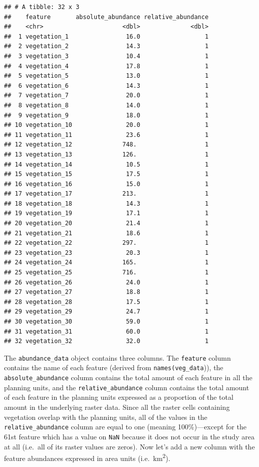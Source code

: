 \documentclass[
  12pt,
]{book}
\begin{document}
\begin{verbatim}
## # A tibble: 32 x 3
##    feature       absolute_abundance relative_abundance
##    <chr>                      <dbl>              <dbl>
##  1 vegetation_1                16.0                  1
##  2 vegetation_2                14.3                  1
##  3 vegetation_3                10.4                  1
##  4 vegetation_4                17.8                  1
##  5 vegetation_5                13.0                  1
##  6 vegetation_6                14.3                  1
##  7 vegetation_7                20.0                  1
##  8 vegetation_8                14.0                  1
##  9 vegetation_9                18.0                  1
## 10 vegetation_10               20.0                  1
## 11 vegetation_11               23.6                  1
## 12 vegetation_12              748.                   1
## 13 vegetation_13              126.                   1
## 14 vegetation_14               10.5                  1
## 15 vegetation_15               17.5                  1
## 16 vegetation_16               15.0                  1
## 17 vegetation_17              213.                   1
## 18 vegetation_18               14.3                  1
## 19 vegetation_19               17.1                  1
## 20 vegetation_20               21.4                  1
## 21 vegetation_21               18.6                  1
## 22 vegetation_22              297.                   1
## 23 vegetation_23               20.3                  1
## 24 vegetation_24              165.                   1
## 25 vegetation_25              716.                   1
## 26 vegetation_26               24.0                  1
## 27 vegetation_27               18.8                  1
## 28 vegetation_28               17.5                  1
## 29 vegetation_29               24.7                  1
## 30 vegetation_30               59.0                  1
## 31 vegetation_31               60.0                  1
## 32 vegetation_32               32.0                  1
\end{verbatim}

The \texttt{abundance\_data} object contains three columns. The \texttt{feature} column contains the name of each feature (derived from \texttt{names(veg\_data})), the \texttt{absolute\_abundance} column contains the total amount of each feature in all the planning units, and the \texttt{relative\_abundance} column contains the total amount of each feature in the planning units expressed as a proportion of the total amount in the underlying raster data. Since all the raster cells containing vegetation overlap with the planning units, all of the values in the \texttt{relative\_abundance} column are equal to one (meaning 100\%)---except for the 61st feature which has a value on \texttt{NaN} because it does not occur in the study area at all (i.e.~all of its raster values are zeros). Now let's add a new column with the feature abundances expressed in area units (i.e.~km\textsuperscript{2}).
\end{document}
